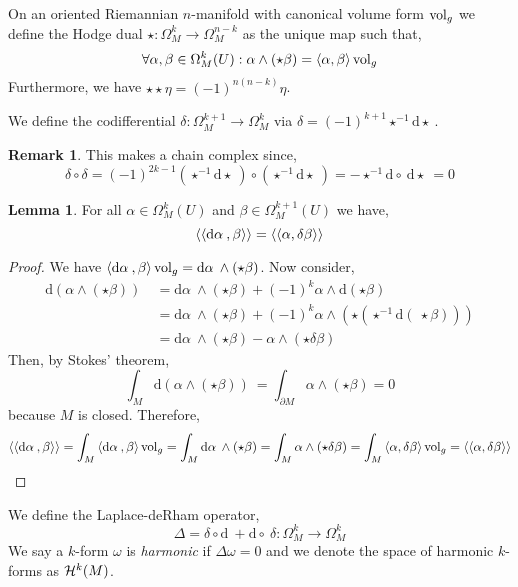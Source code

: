 \documentclass[12pt]{extarticle}
\renewcommand{\d}[1]{ \mathrm{d}#1 \:}
\theoremstyle{definition}
\newtheorem{lemma}[theorem]{Lemma}
\newtheorem{remark}{Remark}
\newenvironment{definition}[1][Definition:]{\begin{trivlist}
\item[\hskip \labelsep {\bfseries #1}]}{\end{trivlist}}
\newcommand{\inner}[2]{\left< #1, #2 \right>}
\begin{document}
\begin{definition}
On an oriented Riemannian $n$-manifold with canonical volume form $\mathrm{vol}_g$ we define the Hodge dual $\star : \Omega^k_M \to \Omega^{n - k}_M$ as the unique map such that, \[ \forall \alpha, \beta \in \Omega^k_M(U) : \alpha \wedge (\star \beta) = \inner{\alpha}{\beta} \vol_g \]
Furthermore, we have $\star \star \eta = (-1)^{n(n-k)} \eta$. 
\end{definition}

\begin{definition}
We define the codifferential $\delta : \Omega^{k+1}_M \to \Omega^k_M$ via $\delta = (-1)^{k+1} \star^{-1} \d \star$. 
\end{definition}

\begin{remark}
This makes a chain complex since,
\[ \delta \circ \delta = (-1)^{2k - 1} (\star^{-1} \d \star) \circ (\star^{-1} \d \star) = - \star^{-1} \d \circ \d \star = 0 \]
\end{remark}

\begin{lemma}
For all $\alpha \in \Omega_M^k(U)$ and $\beta \in \Omega_M^{k+1}(U)$ we have,
\[ \Inner{\d{\alpha}}{\beta} = \Inner{\alpha}{\delta \beta} \] 
\end{lemma}

\begin{proof}
We have $\inner{\d{\alpha}}{\beta} \vol_g = \d{\alpha} \wedge (\star \beta)$. Now consider,
\begin{align*}
\d{( \alpha \wedge ( \star \beta ))} & = \d{\alpha} \wedge (\star \beta) + (-1)^k \alpha \wedge \d{(\star \beta)} 
\\
& = \d{\alpha} \wedge (\star \beta) + (-1)^k \alpha \wedge (\star (\star^{-1} \d (\star \beta ))) 
\\
& = \d{\alpha} \wedge (\star \beta) - \alpha \wedge (\star \delta \beta )
\end{align*}
Then, by Stokes' theorem,
\[ \int_M \d{(\alpha \wedge (\star \beta))} = \int_{\partial M} \alpha \wedge (\star \beta) = 0 \]
because $M$ is closed. Therefore,
\[ \Inner{\d{\alpha}}{\beta} = \int_M \inner{\d{\alpha}}{\beta} \vol_g = \int_M \d{\alpha} \wedge (\star \beta) = \int_M \alpha \wedge (\star \delta \beta ) = \int_M \inner{\alpha}{\delta \beta} \vol_g = \Inner{\alpha}{\delta \beta} \]
\end{proof}

\begin{definition}
We define the Laplace-deRham operator,
\[ \Delta = \delta \circ \d{} + \d \circ \delta : \Omega^k_M \to \Omega^k_M \]
We say a $k$-form $\omega$ is \textit{harmonic} if $\Delta \omega = 0$ and we denote the space of harmonic $k$-forms as $\mathcal{H}^k(M)$. 
\end{definition}
\end{document}
